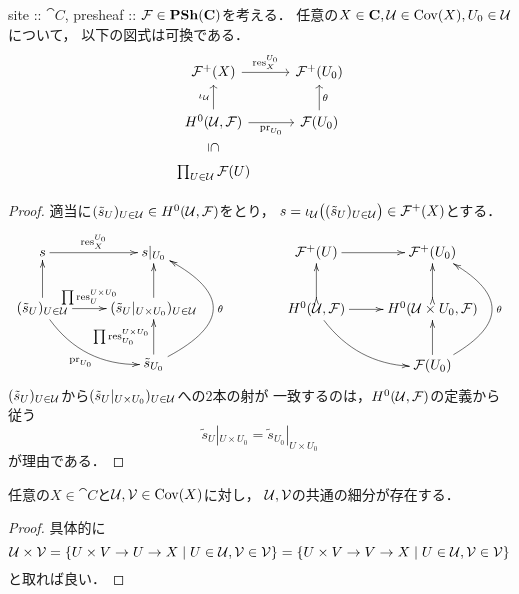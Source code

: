 \documentclass[a4paper, dvipdfmx]{jsarticle}
\begin{document}
\begin{Lemma}[A]
    site :: $\cat{C}$, presheaf :: $\mathcal{F} \in \mathbf{PSh}(\mathbf{C})$を考える．
    任意の$X \in \mathbf{C}, \mathcal{U} \in \operatorname{Cov}(X), U_0 \in \mathcal{U}$について，
    以下の図式は可換である．
    \[\begin{tikzcd}
        \shF^+(X) \ar[r, "\res_X^{U_0}"]& \shF^+(U_0) \\
        H^0(\covU, \shF) \ar[r, "\pr_{U_0}"']\ar[u, "\iota_{\covU}"]& \shF(U_0)\ar[u, "\theta"'] \\
        \prod_{U \in \covU} \shF(U) \ar[u, phantom, "\text{\rotatebox{-90}{$\subseteq$}}"]
    \end{tikzcd}\]
\end{Lemma}
\begin{proof}
    適当に$(\tilde{s}_U)_{U \in \mathcal{U}} \in H^0(\mathcal{U}, \mathcal{F})$をとり，
    $s=\iota_{\mathcal{U}}\big((\tilde{s}_U)_{U \in \mathcal{U}}\big) \in \mathcal{F}^+(X)$とする．
    \[
    \xymatrix
    {
        s \ar[r]^-{\res_{X}^{U_0}}& s|_{U_0} \\
        (\tilde{s}_U)_{U \in \covU}
        \ar[u]\ar[r]^-{\prod \res_{U}^{U \times U_0}}\ar@/_5mm/[rd]_-{\pr_{U_0}}
        &(\tilde{s}_U|_{U \times U_0})_{U \in \covU} \ar[u]\\
            & \tilde{s}_{U_0}\ar@/_15mm/[uu]_-{\theta} \ar[u]^-{\prod \res_{U_0}^{U \times U_0}} 
    }
    \qquad \qquad
    \xymatrix
    {
        \shF^+(U) \ar[r]& \shF^+(U_0) \\
        H^0(\covU, \shF) \ar@{>->}[u]\ar[r]\ar@/_5mm/[rd]
            & H^0(\covU \times U_0, \shF) \ar@{>->}[u]\\
            & \shF(U_0) \ar@/_15mm/[uu]_-{\theta} \ar[u] 
    }
    \]
    $(\tilde{s}_U)_{U \in \mathcal{U}}$から$(\tilde{s}_U|_{U \times U_0})_{U \in \mathcal{U}}$への$2$本の射が
    一致するのは，$H^0(\mathcal{U}, \mathcal{F})$の定義から従う
    \[ \tilde{s}_{U}|_{U \times U_0}=\tilde{s}_{U_0}|_{U \times U_0} \]
    が理由である．
\end{proof}

\begin{Lemma}[B]
    任意の$X \in \cat{C}$と$\mathcal{U}, \mathcal{V} \in \operatorname{Cov}(X)$に対し，
    $\mathcal{U}, \mathcal{V}$の共通の細分が存在する．
\end{Lemma}
\begin{proof}
    具体的に
    \[
        \mathcal{U} \times \mathcal{V}
        =\{ U \times V \to U \to X \mid U \in \mathcal{U}, \mathcal{V} \in \mathcal{V}\}
        =\{ U \times V \to V \to X \mid U \in \mathcal{U}, \mathcal{V} \in \mathcal{V}\}
    \]
    と取れば良い．
\end{proof}
\end{document}
